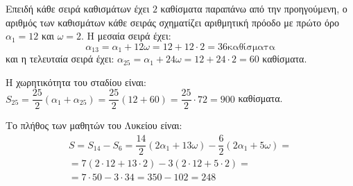 
\begin{alist}
\item Επειδή κάθε σειρά καθισμάτων έχει $2$ καθίσματα παραπάνω από την προηγούμενη, ο αριθμός των καθισμάτων κάθε σειράς σχηματίζει αριθμητική πρόοδο με πρώτο όρο $\alpha_1 = 12$ και $\omega = 2$.
Η μεσαία σειρά έχει:
\[\alpha_{13} = \alpha_1 + 12\omega = 12 + 12 \cdot 2 = 36\text{καθίσματα}\]
και η τελευταία σειρά έχει:
$\alpha_{25} = \alpha_1 + 24\omega = 12 + 24 \cdot 2 = 60$ καθίσματα.

\item Η χωρητικότητα του σταδίου είναι:
$S_{25} = \dfrac{25}{2}(\alpha_1 + \alpha_{25}) = \dfrac{25}{2}(12 + 60) = \dfrac{25}{2} \cdot 72 = 900$ καθίσματα.

\item Το πλήθος των μαθητών του Λυκείου είναι:
\begin{gather*}
S = S_{14} - S_6 = \dfrac{14}{2}(2\alpha_1 + 13\omega) - \dfrac{6}{2}(2\alpha_1 + 5\omega) = \\
= 7(2 \cdot 12 + 13 \cdot 2) - 3(2 \cdot 12 + 5 \cdot 2) = \\
= 7 \cdot 50 - 3 \cdot 34 = 350 - 102 = 248
\end{gather*}
\end{alist}

